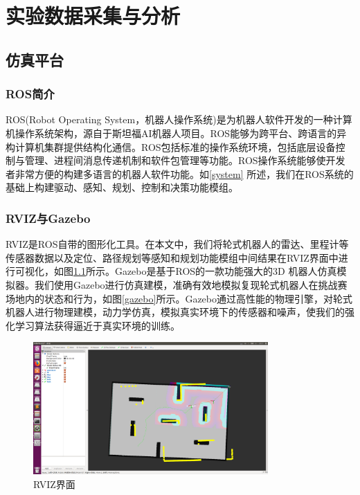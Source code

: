 \chapter{实验数据采集与分析}\label{experiment}

\section{仿真平台}
\subsection{ROS简介}
ROS(Robot Operating System，机器人操作系统)是为机器人软件开发的一种计算机操作系统架构，源自于斯坦福AI机器人项目。ROS能够为跨平台、跨语言的异构计算机集群提供结构化通信。ROS包括标准的操作系统环境，包括底层设备控制与管理、进程间消息传递机制和软件包管理等功能。ROS操作系统能够使开发者非常方便的构建多语言的机器人软件功能。如\ref{system} 所述，我们在ROS系统的基础上构建驱动、感知、规划、控制和决策功能模组。

\subsection{RVIZ与Gazebo}
RVIZ是ROS自带的图形化工具。在本文中，我们将轮式机器人的雷达、里程计等传感器数据以及定位、路径规划等感知和规划功能模组中间结果在RVIZ界面中进行可视化，如图\ref{rviz}所示。Gazebo是基于ROS的一款功能强大的3D 机器人仿真模拟器。我们使用Gazebo进行仿真建模，准确有效地模拟复现轮式机器人在挑战赛场地内的状态和行为，如图\ref{gazebo}所示。Gazebo通过高性能的物理引擎，对轮式机器人进行物理建模，动力学仿真，模拟真实环境下的传感器和噪声，使我们的强化学习算法获得逼近于真实环境的训练。
\begin{figure}[ht]
  \centering
  \includegraphics[width=0.80\textwidth]{figures/rviz.jpg}
  \caption{RVIZ界面}\label{rviz}
\end{figure}

